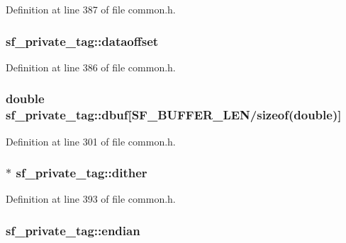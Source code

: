 Definition at line 387 of file common.\+h.

\subsubsection[{\texorpdfstring{dataoffset}{dataoffset}}]{ sf\+\_\+private\+\_\+tag\+::dataoffset}\hypertarget{structsf__private__tag_a62eab65784107dfa9ec026a4e0d5c80e}{}\label{structsf__private__tag_a62eab65784107dfa9ec026a4e0d5c80e}


Definition at line 386 of file common.\+h.

\subsubsection[{\texorpdfstring{dbuf}{dbuf}}]{\setlength{\rightskip}{0pt plus 5cm}double sf\+\_\+private\+\_\+tag\+::dbuf\mbox{[}{\bf S\+F\+\_\+\+B\+U\+F\+F\+E\+R\+\_\+\+L\+EN}/sizeof(double)\mbox{]}}\hypertarget{structsf__private__tag_a7c787747ba90f18d9127a5b87a1b1e9a}{}\label{structsf__private__tag_a7c787747ba90f18d9127a5b87a1b1e9a}


Definition at line 301 of file common.\+h.

\subsubsection[{\texorpdfstring{dither}{dither}}]{$\ast$ sf\+\_\+private\+\_\+tag\+::dither}\hypertarget{structsf__private__tag_aba15dda9ff8ed723edd47ef171800828}{}\label{structsf__private__tag_aba15dda9ff8ed723edd47ef171800828}


Definition at line 393 of file common.\+h.

\subsubsection[{\texorpdfstring{endian}{endian}}]{ sf\+\_\+private\+\_\+tag\+::endian}\hypertarget{structsf__private__tag_a2ea2f21776efd69f43a7fdf87b13d23a}{}\label{structsf__private__tag_a2ea2f21776efd69f43a7fdf87b13d23a}


